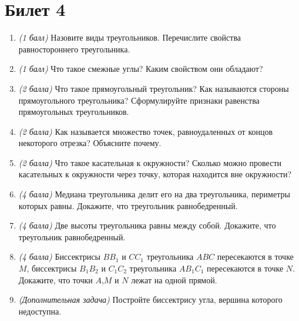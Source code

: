 \documentclass[12pt, a4paper]{article}
\begin{document}
\section*{Билет 4}
\begin{enumerate}
\item \textit{(1 балл)} Назовите виды треугольников. Перечислите свойства равностороннего треугольника.
\item \textit{(1 балл)} Что такое смежные углы? Каким свойством они обладают?
\item \textit{(2 балла)} Что такое прямоугольный треугольник? Как называются стороны прямоугольного треугольника? Сформулируйте признаки равенства прямоугольных треугольников.
\item \textit{(2 балла)} Как называется множество точек, равноудаленных от концов некоторого отрезка? Объясните почему.
\item \textit{(2 балла)} Что такое касательная к окружности? Сколько можно провести касательных к окружности через точку, которая находится вне окружности?
\item \textit{(4 балла)} Медиана треугольника делит его на два треугольника, периметры которых равны. Докажите, что треугольник равнобедренный.
\item \textit{(4 балла)} Две высоты треугольника равны между собой. Докажите, что треугольник равнобедренный.
\item \textit{(4 балла)} Биссектрисы $BB_1$ и $CC_1$ треугольника $ABC$ пересекаются в точке $M$, биссектрисы $B_1B_2$ и $C_1C_2$ треугольника $AB_1C_1$ пересекаются в точке $N$. Докажите, что точки $A$,$M$ и $N$ лежат на одной прямой.
\item \textit{(Дополнительная задача)} Постройте биссектрису угла, вершина которого недоступна.
\end{enumerate}
\end{document}
